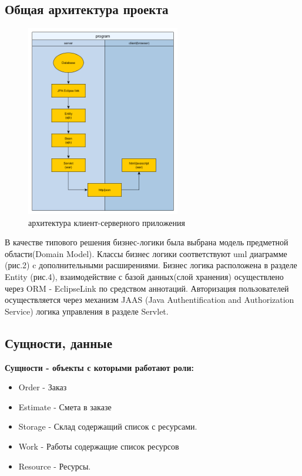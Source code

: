 \subsection{Общая архитектура проекта}
\begin{figure}[!ht]
	\centering
	\includegraphics[width=0.6\textwidth]{img/architecture.png}
	\caption{архитектура клиент-серверного приложения}
\end{figure}

В качестве типового решения бизнес-логики была выбрана модель предметной области(Domain Model). Классы бизнес логики соответствуют uml диаграмме (рис.2) c дополнительными расширениями.
Бизнес логика расположена в разделе Entity (рис.4), взаимодействие с базой данных(слой хранения) осуществлено через ORM - EclipseLink по средством аннотаций. Авторизация пользователей осуществляется через механизм JAAS (Java Authentification and Authorization Service) логика управления в разделе Servlet.
\newpage
\subsection{Сущности, данные}
\textbf{Сущности - объекты с которыми работают роли:}

\begin{itemize}
\item Order - Заказ
\item Estimate - Смета в заказе
\item Storage - Склад содержащий список с ресурсами.
\item Work - Работы содержащие список ресурсов
\item Resource - Ресурсы.
\end{itemize}

